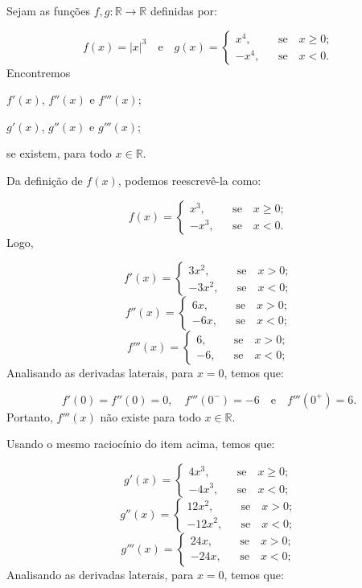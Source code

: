 \cleardoublepage\documentclass[../main.tex]{subfiles}
\begin{document}
\begin{exeresol}
  Sejam as funções \(f,g:\mathbb{R}\to \mathbb{R}\) definidas por:

\[ f(x)=|x|^3 \quad \mbox{e}\quad g(x)=\left\{\begin{array}{rcl} x^4,&&\mbox{se}\quad x\geq0;\\ -x^4,&&\mbox{se}\quad x<0. \end{array}\right. \]
Encontremos
\begin{compactenum}[a.]
  \item \(f'(x)\), \(f''(x)\) e \(f'''(x)\);
\item \(g'(x)\), \(g''(x)\) e \(g'''(x)\);
\end{compactenum}
se existem, para todo \(x\in\mathbb{R}\).

\begin{resol}
    \begin{compactenum}[a.]
      \item Da definição de \(f(x)\), podemos reescrevê-la como:

\[ f(x)=\left\{\begin{array}{rcl} x^3,&&\mbox{se}\quad x\geq0;\\ -x^3,&&\mbox{se}\quad x<0. \end{array}\right. \]
Logo,

\[ f'(x)=\left\{\begin{array}{rcl} 3x^2,&&\mbox{se}\quad x>0;\\ -3x^2,&&\mbox{se}\quad x<0; \end{array}\right. \] \[ f''(x)=\left\{\begin{array}{rcl} 6x,&&\mbox{se}\quad x>0;\\ -6x,&&\mbox{se}\quad x<0; \end{array}\right. \] \[ f'''(x)=\left\{\begin{array}{rcl} 6,&&\mbox{se}\quad x>0;\\ -6,&&\mbox{se}\quad x<0; \end{array}\right. \]
Analisando as derivadas laterais, para \(x=0\), temos que:

\[ f'(0)=f''(0)=0,\quad f'''(0^-)=-6 \quad \mbox{e}\quad f'''(0^+)=6. \]
Portanto, \(f'''(x)\) não existe para todo \(x \in \mathbb{R}\).
\item Usando o mesmo raciocínio do item acima, temos que:

\[ g'(x)=\left\{\begin{array}{rcl} 4x^3,&&\mbox{se}\quad x\geq0;\\ -4x^3,&&\mbox{se}\quad x<0; \end{array}\right. \] \[ g''(x)=\left\{\begin{array}{rcl} 12x^2,&&\mbox{se}\quad x>0;\\ -12x^2,&&\mbox{se}\quad x<0; \end{array}\right. \] \[ g'''(x)=\left\{\begin{array}{rcl} 24x,&&\mbox{se}\quad x>0;\\ -24x,&&\mbox{se}\quad x<0; \end{array}\right. \]
Analisando as derivadas laterais, para \(x=0\), temos que:


\end{compactenum}
\end{resol}
\end{exeresol}
\end{document}
